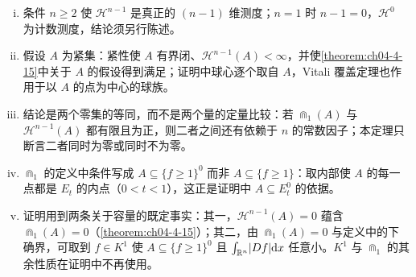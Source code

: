 ﻿\documentclass[../../main.tex]{subfiles}%
\begin{document}
\begin{remark}\label{remark:ch05-thm-5-12-条件}
\begin{enumerate}[(i)]
\item 条件 $n\geqslant2$ 使 $\mathcal{H}^{n-1}$ 是真正的 $(n-1)$ 维测度；$n=1$ 时 $n-1=0$，$\mathcal{H}^0$ 为计数测度，结论须另行陈述。
\item 假设 $A$ 为紧集：紧性使 $A$ 有界闭、$\mathcal{H}^{n-1}(A)<\infty$，并使\cref{theorem:ch04-4-15}中关于 $A$ 的假设得到满足；证明中球心逐个取自 $A$，Vitali 覆盖定理也作用于以 $A$ 的点为中心的球族。%
\item 结论是两个零集的等同，而不是两个量的定量比较：若 $\Cap_1(A)$ 与 $\mathcal{H}^{n-1}(A)$ 都有限且为正，则二者之间还有依赖于 $n$ 的常数因子；本定理只断言二者同时为零或同时不为零。
\item $\Cap_1$ 的定义中条件写成 $A\subseteq\{f\geqslant1\}^0$ 而非 $A\subseteq\{f\geqslant1\}$：取内部使 $A$ 的每一点都是 $E_t$ 的内点（$0<t<1$），这正是证明中 $A\subseteq E_t^0$ 的依据。
\item 证明用到两条关于容量的既定事实：其一，$\mathcal{H}^{n-1}(A)=0$ 蕴含 $\Cap_1(A)=0$（\cref{theorem:ch04-4-15}）；其二，由 $\Cap_1(A)=0$ 与定义中的下确界，可取到 $f\in K^1$ 使 $A\subseteq\{f\geqslant1\}^0$ 且 $\int_{\mathbb{R}^n}\lvert Df\rvert\mathrm{d} x$ 任意小。$K^1$ 与 $\Cap_1$ 的其余性质在证明中不再使用。%
\end{enumerate}
\end{remark}
\end{document}
